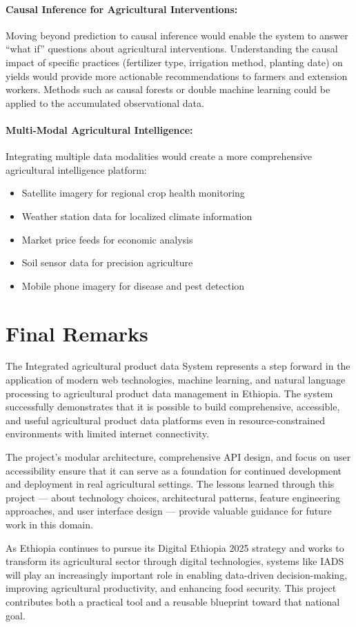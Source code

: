 \paragraph{Causal Inference for Agricultural Interventions:}
Moving beyond prediction to causal inference would enable the system to answer ``what if'' questions about agricultural interventions. Understanding the causal impact of specific practices (fertilizer type, irrigation method, planting date) on yields would provide more actionable recommendations to farmers and extension workers. Methods such as causal forests or double machine learning could be applied to the accumulated observational data.

\paragraph{Multi-Modal Agricultural Intelligence:}
Integrating multiple data modalities would create a more comprehensive agricultural intelligence platform:
\begin{itemize}
  \item Satellite imagery for regional crop health monitoring
  \item Weather station data for localized climate information
  \item Market price feeds for economic analysis
  \item Soil sensor data for precision agriculture
  \item Mobile phone imagery for disease and pest detection
\end{itemize}

\section{Final Remarks}

The Integrated agricultural product data System represents a step forward in the application of modern web technologies, machine learning, and natural language processing to agricultural product data management in Ethiopia. The system successfully demonstrates that it is possible to build comprehensive, accessible, and useful agricultural product data platforms even in resource-constrained environments with limited internet connectivity.

The project's modular architecture, comprehensive API design, and focus on user accessibility ensure that it can serve as a foundation for continued development and deployment in real agricultural settings. The lessons learned through this project --- about technology choices, architectural patterns, feature engineering approaches, and user interface design --- provide valuable guidance for future work in this domain.

As Ethiopia continues to pursue its Digital Ethiopia 2025 strategy and works to transform its agricultural sector through digital technologies, systems like IADS will play an increasingly important role in enabling data-driven decision-making, improving agricultural productivity, and enhancing food security. This project contributes both a practical tool and a reusable blueprint toward that national goal.
